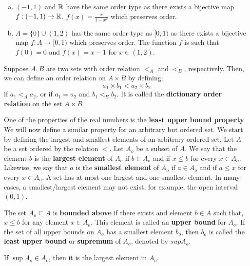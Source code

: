 \documentclass[a4paper,english,12pt]{article}
\begin{document}
\begin{exmp}
\begin{enumerate}[a)]
\item $(-1, 1)$ and $\mathbb{R}$ have the same order type as there exists a bijective map $f:(-1, 1) \to \mathbb{R}$, $f(x) = \frac{x}{1 - x^{2}}$ which preserves order.
\item $A = \{0\} \cup (1, 2)$ has the same order type as $[0, 1)$ as there exists a bijective map $f: A \to [0, 1)$ which preserves order. The function $f$ is such that $f(0) = 0$ and $f(x) = x-1$ for $x \in (1, 2)$.

\end{enumerate}
\end{exmp}


\begin{defn} 
Suppose $A, B$ are two sets with order relation $<_{A}$ and $<_{B}$, respectively. Then, we can define an order relation on $A \times B$ by defining: 
\begin{equation}
a_{1} \times b_{1} < a_{2} \times b_{2} \nonumber
\end{equation}
if $a_{1} <_{A} a_{2}$, or if $a_{1} = a_{2}$ and $b_{1} <_{B} b_{2}$. It is called the \textbf{dictionary order relation} on the set $A \times B$. 
\end{defn}

One of the properties of the real numbers is the \textbf{least upper bound property}. We will now define a similar property for an arbitrary but ordered set. We start by defining the largest and smallest elements of an arbitrary ordered set. Let $A$ be a set ordered by the relation $<$. Let $A_{o}$ be a subset of $A$.  We say that the element $b$ is the \textbf{largest element} of $A_{o}$ if $b \in A_{o}$ and if $x \le b$ for every $x \in A_{o}$. Likewise, we say that $a$ is the \textbf{smallest element} of $A_{o}$ if $a \in A_{o}$ and if $a \le x$ for every $x \in A_{o}$. A set has at most one largest and one smallest element. In many cases, a smallest/largest element may not exist, for example, the open interval $(0,1)$. 

\begin{defn}
The set $A_{o} \subseteq A$ is \textbf{bounded above} if there exists and element $b \in A$ such that, $x \le b$ for any element $x \in A_{o}$. This element is called an \textbf{upper bound} for $A_{o}$. If the set of all upper bounds on $A_{o}$ has a smallest element $b_{o}$, then $b_{o}$ is called the \textbf{least upper bound} or \textbf{supremum} of $A_{o}$, denoted by $sup A_{o}$.  

If $\sup A_{o} \in A_{o}$, then it is the largest element in $A_{o}$.
\end{defn}
\end{document}
